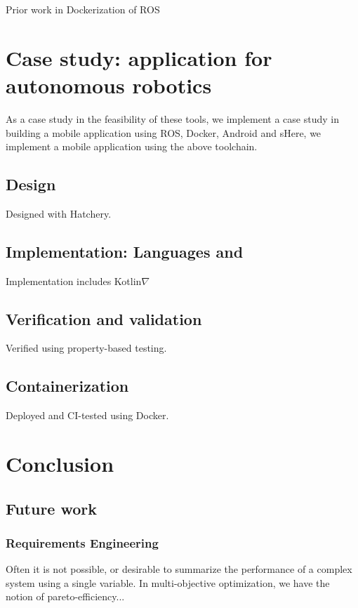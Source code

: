 \documentclass[12pt,initial,twoside,maitrise]{dms}
\numberwithin{equation}{section}
\numberwithin{table}{chapter}
\numberwithin{figure}{chapter}
\begin{document}
Prior work in Dockerization of ROS \cite{white2017ros-docker}

\chapter{Case study: application for autonomous robotics}

As a case study in the feasibility of these tools, we implement a case study in building a mobile application using ROS, Docker, Android and sHere, we implement a mobile application using the above toolchain.

\section{Design}

Designed with Hatchery.

\section{Implementation: Languages and }

Implementation includes Kotlin$\nabla$

\section{Verification and validation}

Verified using property-based testing.

\section{Containerization}

Deployed and CI-tested using Docker.

\chapter{Conclusion}\label{ch:conclusion}

\section{Future work}

\subsection{Requirements Engineering}

Often it is not possible, or desirable to summarize the performance of a complex system using a single variable. In multi-objective optimization, we have the notion of pareto-efficiency...
\end{document}
